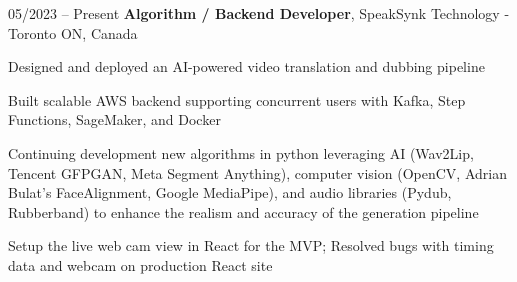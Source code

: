 \begin{twocolentry}{
    05/2023 – Present
}
\fontsize{11 pt}{11 pt}\textbf{Algorithm / Backend Developer}, SpeakSynk Technology - Toronto ON, Canada\end{twocolentry}

\vspace{0.10 cm}
\begin{onecolentry}
    \begin{highlights}
        \item Designed and deployed an AI-powered video translation and dubbing pipeline
        \item Built scalable AWS backend supporting concurrent users with Kafka, Step Functions, SageMaker, and Docker
        \item Continuing development new algorithms in python leveraging AI (Wav2Lip, Tencent GFPGAN, Meta Segment Anything), computer vision (OpenCV, Adrian Bulat’s FaceAlignment, Google MediaPipe), and audio libraries (Pydub, Rubberband) to enhance the realism and accuracy of the generation pipeline 
        \item Setup the live web cam view in React for the MVP; Resolved bugs with timing data and webcam on production React site
    \end{highlights}
\end{onecolentry}

